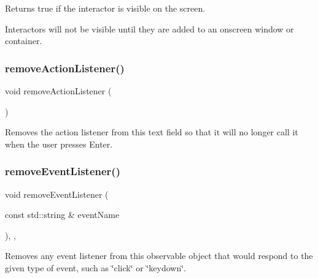 Returns true if the interactor is visible on the screen. 

Interactors will not be visible until they are added to an onscreen window or container. \mbox{\label{classGTextField_ab7fe7a876367b87cf7202f947f1d05e4}} 
\subsubsection{\texorpdfstring{remove\+Action\+Listener()}{removeActionListener()}}
{\footnotesize\ttfamily void remove\+Action\+Listener (\begin{DoxyParamCaption}{ }\end{DoxyParamCaption})\hspace{0.3cm}{\ttfamily [virtual]}}



Removes the action listener from this text field so that it will no longer call it when the user presses Enter. 

\mbox{\label{classGObservable_acbcf1ed3a851ad8a3c17ef38d86b481d}} 
\subsubsection{\texorpdfstring{remove\+Event\+Listener()}{removeEventListener()}}
{\footnotesize\ttfamily void remove\+Event\+Listener (\begin{DoxyParamCaption}\item[{const std\+::string \&}]{event\+Name }\end{DoxyParamCaption})\hspace{0.3cm}{\ttfamily [protected]}, {\ttfamily [virtual]}, {\ttfamily [inherited]}}



Removes any event listener from this observable object that would respond to the given type of event, such as \char`\"{}click\char`\"{} or \char`\"{}keydown\char`\"{}. 

\mbox{\label{classGObservable_af51cc35c29a1bd1908609d432decdbb6}} 
